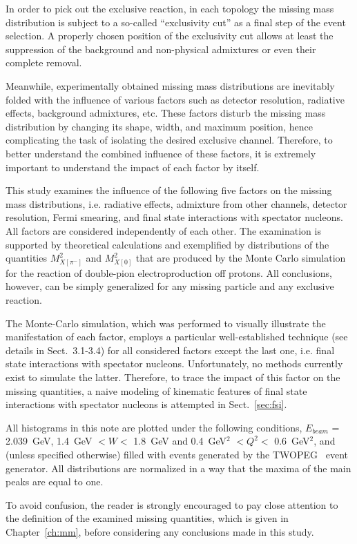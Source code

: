 In order to pick out the exclusive reaction, in each topology the missing mass distribution is subject to a so-called ``exclusivity cut'' as a final step of the event selection. A properly chosen position of the exclusivity cut allows at least the suppression of the background and non-physical admixtures or even their complete removal.


Meanwhile, experimentally obtained missing mass distributions are inevitably folded with the influence of various factors such as detector resolution, radiative effects, background admixtures, etc. These factors disturb the missing mass distribution by changing its shape, width, and maximum position, hence complicating the task of isolating the desired exclusive channel. Therefore, to better understand the combined influence of these factors, it is extremely important to understand the impact of each factor by itself.


This study examines the influence of the following five factors on the missing mass distributions, i.e. radiative effects, admixture from other channels, detector resolution, Fermi smearing, and final state interactions with spectator nucleons. All factors are considered independently of each other. The examination is supported by theoretical calculations and exemplified by distributions of the quantities $M^{2}_{X[\pi^{-}]}$ and $M^{2}_{X[0]}$ that are produced by the Monte Carlo simulation for the reaction of double-pion electroproduction off protons. All conclusions, however, can be simply generalized for any missing particle and any exclusive reaction.


The Monte-Carlo simulation, which was performed to visually illustrate the manifestation of each factor, employs a particular well-established technique (see details in Sect.~3.1-3.4) for all considered factors except the last one, i.e. final state interactions with spectator nucleons. Unfortunately, no methods currently exist to simulate the latter. Therefore, to trace the impact of this factor on the missing quantities, a naive modeling of kinematic features of final state interactions with spectator nucleons is attempted in Sect.~\ref{sec:fsi}.


All histograms in this note are plotted under the following conditions, $E_{beam}$ = 2.039~GeV, 1.4~GeV $< W <$ 1.8~GeV and 0.4~GeV$^{2}$ $< Q^{2} <$ 0.6~GeV$^{2}$, and (unless specified otherwise) filled with events generated by the TWOPEG~\cite{twopeg} event generator. All distributions are normalized in a way that the maxima of the main peaks are equal to one.


To avoid confusion, the reader is strongly encouraged to pay close attention to the definition of the examined missing quantities, which is given in Chapter~\ref{ch:mm}, before considering any conclusions made in this study. 



